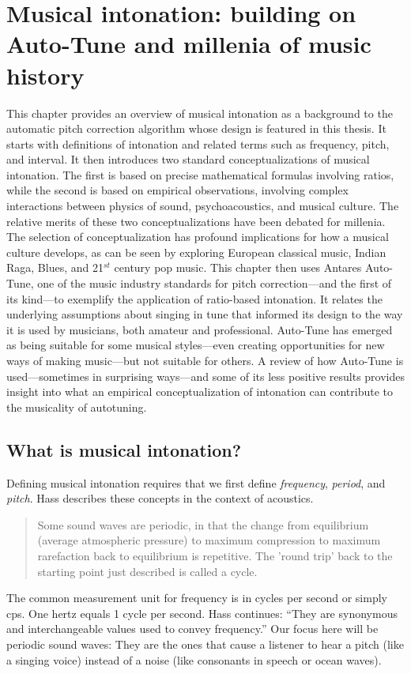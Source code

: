 \chapter{Musical intonation: building on Auto-Tune and millenia of music history}
\label{chap:intonation}
This chapter provides an overview of musical intonation as a background to the automatic pitch correction algorithm whose design is featured in this thesis. It starts with definitions of intonation and related terms such as frequency, pitch, and interval. It then introduces two standard conceptualizations of musical intonation. The first is based on precise mathematical formulas involving ratios, while the second is based on empirical observations, involving complex interactions between physics of sound, psychoacoustics, and musical culture. The relative merits of these two conceptualizations have been debated for millenia. The selection of conceptualization has profound implications for how a musical culture develops, as can be seen by exploring European classical music, Indian Raga, Blues, and 21$^{st}$ century pop music. This chapter then uses Antares Auto-Tune, one of the music industry standards for pitch correction---and the first of its kind---to exemplify the application of ratio-based intonation. It relates the underlying assumptions about singing in tune that informed its design to the way it is used by musicians, both amateur and professional. Auto-Tune has emerged as being suitable for some musical styles---even creating opportunities for new ways of making music---but not suitable for others. A review of how Auto-Tune is used---sometimes in surprising ways---and some of its less positive results provides insight into what an empirical conceptualization of intonation can contribute to the musicality of autotuning.

\section{What is musical intonation?} 
Defining musical intonation requires that we first define \textit{frequency}, \textit{period}, and \textit{pitch}. Hass describes these concepts in the context of acoustics. \begin{quotation}Some sound waves are periodic, in that the change from equilibrium (average atmospheric pressure) to maximum compression to maximum rarefaction back to equilibrium is repetitive. The 'round trip' back to the starting point just described is called a cycle.\end{quotation} The common measurement unit for frequency is in cycles per second or simply cps. One hertz equals 1 cycle per second. Hass continues: ``They are synonymous and interchangeable values used to convey frequency.'' \cite[][Ch.~1, Sec.~4--5]{hass2019introduction} Our focus here will be periodic sound waves: They are the ones that cause a listener to hear a pitch (like a singing voice) instead of a noise (like consonants in speech or ocean waves). %

